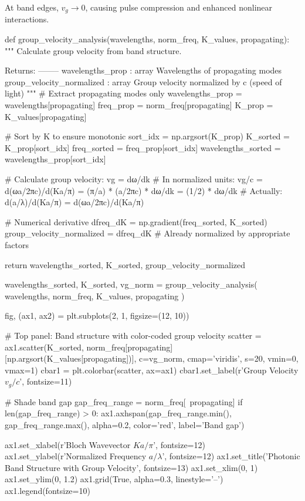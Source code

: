 \documentclass[11pt,a4paper]{article}
\begin{document}
At band edges, $v_g \to 0$, causing pulse compression and enhanced nonlinear interactions.

\begin{pycode}
def group_velocity_analysis(wavelengths, norm_freq, K_values, propagating):
    """
    Calculate group velocity from band structure.

    Returns:
    --------
    wavelengths_prop : array
        Wavelengths of propagating modes
    group_velocity_normalized : array
        Group velocity normalized by c (speed of light)
    """
    # Extract propagating modes only
    wavelengths_prop = wavelengths[propagating]
    freq_prop = norm_freq[propagating]
    K_prop = K_values[propagating]

    # Sort by K to ensure monotonic
    sort_idx = np.argsort(K_prop)
    K_sorted = K_prop[sort_idx]
    freq_sorted = freq_prop[sort_idx]
    wavelengths_sorted = wavelengths_prop[sort_idx]

    # Calculate group velocity: vg = dω/dk
    # In normalized units: vg/c = d(ωa/2πc)/d(Ka/π) = (π/a) * (a/2πc) * dω/dk = (1/2) * dω/dk
    # Actually: d(a/λ)/d(Ka/π) = d(ωa/2πc)/d(Ka/π)

    # Numerical derivative
    dfreq_dK = np.gradient(freq_sorted, K_sorted)
    group_velocity_normalized = dfreq_dK  # Already normalized by appropriate factors

    return wavelengths_sorted, K_sorted, group_velocity_normalized

wavelengths_sorted, K_sorted, vg_norm = group_velocity_analysis(
    wavelengths, norm_freq, K_values, propagating
)

fig, (ax1, ax2) = plt.subplots(2, 1, figsize=(12, 10))

# Top panel: Band structure with color-coded group velocity
scatter = ax1.scatter(K_sorted, norm_freq[propagating][np.argsort(K_values[propagating])],
                     c=vg_norm, cmap='viridis', s=20, vmin=0, vmax=1)
cbar1 = plt.colorbar(scatter, ax=ax1)
cbar1.set_label(r'Group Velocity $v_g/c$', fontsize=11)

# Shade band gap
gap_freq_range = norm_freq[~propagating]
if len(gap_freq_range) > 0:
    ax1.axhspan(gap_freq_range.min(), gap_freq_range.max(),
               alpha=0.2, color='red', label='Band gap')

ax1.set_xlabel(r'Bloch Wavevector $Ka/\pi$', fontsize=12)
ax1.set_ylabel(r'Normalized Frequency $a/\lambda$', fontsize=12)
ax1.set_title('Photonic Band Structure with Group Velocity', fontsize=13)
ax1.set_xlim(0, 1)
ax1.set_ylim(0, 1.2)
ax1.grid(True, alpha=0.3, linestyle='--')
ax1.legend(fontsize=10)


\end{pycode}
\end{document}

